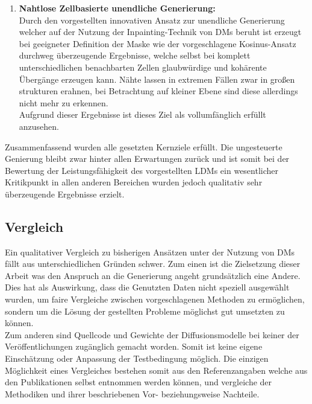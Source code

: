 \begin{enumerate}
    \item \textbf {Nahtlose Zellbasierte unendliche Generierung:} \\
    Durch den vorgestellten innovativen Ansatz zur unendliche Generierung welcher auf der Nutzung der Inpainting-Technik von DMs beruht ist erzeugt bei geeigneter Definition der Maske wie der vorgeschlagene Kosinus-Ansatz durchweg überzeugende Ergebnisse, welche selbst bei komplett unterschiedlichen benachbarten Zellen glaubwürdige und kohärente Übergänge erzeugen kann. Nähte lassen in extremen Fällen zwar in großen strukturen erahnen, bei Betrachtung auf kleiner Ebene sind diese allerdings nicht mehr zu erkennen. \\
    Aufgrund dieser Ergebnisse ist dieses Ziel als vollumfänglich erfüllt anzusehen.     

\end{enumerate}
Zusammenfassend wurden alle gesetzten Kernziele erfüllt. Die ungesteuerte Genierung bleibt zwar hinter allen Erwartungen zurück und ist somit bei der Bewertung der Leistungsfähigkeit des vorgestellten LDMs ein wesentlicher Kritikpunkt in allen anderen Bereichen wurden jedoch qualitativ sehr überzeugende Ergebnisse erzielt. 
 
\subsection{Vergleich}

Ein qualitativer Vergleich zu bisherigen Ansätzen unter der Nutzung von DMs fällt aus unterschiedlichen Gründen schwer. Zum einen ist die Zielsetzung dieser Arbeit was den Anspruch an die Generierung angeht grundsätzlich eine Andere. Dies hat als Auswirkung, dass die Genutzten Daten nicht speziell ausgewählt wurden, um faire Vergleiche zwischen vorgeschlagenen Methoden zu ermöglichen, sondern um die Lösung der gestellten Probleme möglichst gut umsetzten zu können. \\
Zum anderen sind Quellcode und Gewichte der Diffusionsmodelle bei keiner der Veröffentlichungen zugänglich gemacht worden. Somit ist keine eigene Einschätzung oder Anpassung der Testbedingung möglich. Die einzigen Möglichkeit eines Vergleiches bestehen somit aus den Referenzangaben welche aus den Publikationen selbst entnommen werden können, und vergleiche der Methodiken und ihrer beschriebenen Vor- beziehungsweise Nachteile. 




